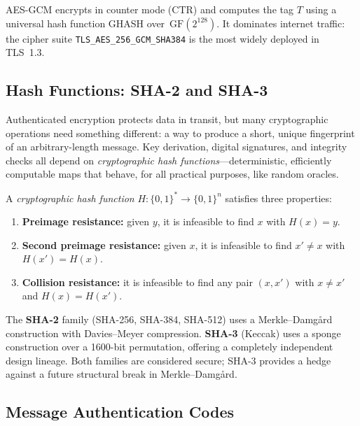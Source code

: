 AES-GCM encrypts in counter mode (CTR) and computes the tag $T$ using a universal hash function GHASH over~$\mathrm{GF}(2^{128})$.  It dominates internet traffic: the cipher suite \texttt{TLS\_AES\_256\_GCM\_SHA384} is the most widely deployed in TLS~1.3.

\subsection{Hash Functions: SHA-2 and SHA-3}
\label{subsec:hash-functions}

Authenticated encryption protects data in transit, but many cryptographic operations need something different: a way to produce a short, unique fingerprint of an arbitrary-length message.  Key derivation, digital signatures, and integrity checks all depend on \emph{cryptographic hash functions}---deterministic, efficiently computable maps that behave, for all practical purposes, like random oracles.

\begin{definition}
\label{def:hash-function}
A \emph{cryptographic hash function} $H:\{0,1\}^* \to \{0,1\}^n$ satisfies three properties:
\begin{enumerate}
\item \textbf{Preimage resistance:} given $y$, it is infeasible to find $x$ with $H(x) = y$.
\item \textbf{Second preimage resistance:} given $x$, it is infeasible to find $x' \neq x$ with $H(x') = H(x)$.
\item \textbf{Collision resistance:} it is infeasible to find any pair $(x, x')$ with $x \neq x'$ and $H(x) = H(x')$.
\end{enumerate}
\end{definition}

The \textbf{SHA-2} family (SHA-256, SHA-384, SHA-512) uses a Merkle--Damg\r{a}rd construction with Davies--Meyer compression.  \textbf{SHA-3} (Keccak) uses a sponge construction over a 1600-bit permutation, offering a completely independent design lineage.  Both families are considered secure; SHA-3 provides a hedge against a future structural break in Merkle--Damg\r{a}rd.

\subsection{Message Authentication Codes}
\label{subsec:macs}

